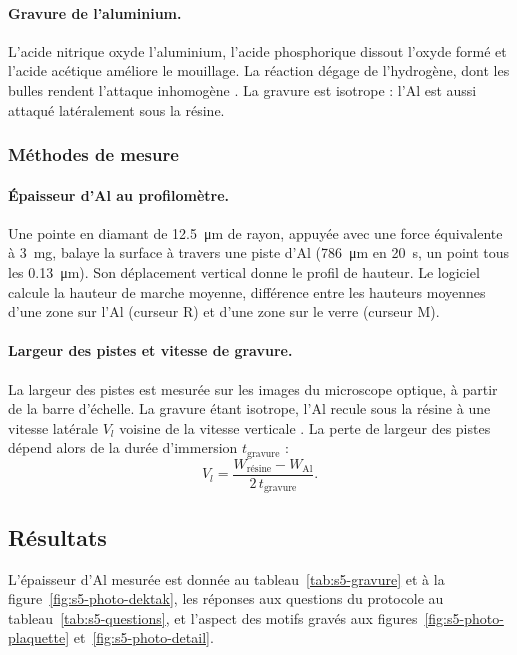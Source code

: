 \paragraph{Gravure de l'aluminium.}
L'acide nitrique oxyde l'aluminium, l'acide phosphorique dissout l'oxyde formé et l'acide acétique améliore le mouillage. La réaction dégage de l'hydrogène, dont les bulles rendent l'attaque inhomogène \cite{alumicro}. La gravure est isotrope : l'Al est aussi attaqué latéralement sous la résine.

\FloatBarrier
\subsubsection{Méthodes de mesure}

\paragraph{Épaisseur d'Al au profilomètre.}Une pointe en diamant de \qty{12,5}{\micro\metre} de rayon, appuyée avec une force équivalente à \qty{3}{\milli\gram}, balaye la surface à travers une piste d'Al (\qty{786}{\micro\metre} en \qty{20}{\second}, un point tous les \qty{0,13}{\micro\metre}). Son déplacement vertical donne le profil de hauteur. Le logiciel calcule la hauteur de marche moyenne, différence entre les hauteurs moyennes d'une zone sur l'Al (curseur R) et d'une zone sur le verre (curseur M).

\paragraph{Largeur des pistes et vitesse de gravure.}
La largeur des pistes est mesurée sur les images du microscope optique, à partir de la barre d'échelle. La gravure étant isotrope, l'Al recule sous la résine à une vitesse latérale $V_l$ voisine de la vitesse verticale . La perte de largeur des pistes dépend alors de la durée d'immersion $t_{\text{gravure}}$ \cite{intro} :
\begin{equation}
  V_l = \frac{W_{\text{résine}} - W_{\text{Al}}}{2\,t_{\text{gravure}}} .
  \label{eq:gravure}
\end{equation}

\subsection{Résultats}
L'épaisseur d'Al mesurée est donnée au tableau~\ref{tab:s5-gravure} et à la figure~\ref{fig:s5-photo-dektak}, les réponses aux questions du protocole au tableau~\ref{tab:s5-questions}, et l'aspect des motifs gravés aux figures~\ref{fig:s5-photo-plaquette} et~\ref{fig:s5-photo-detail}.

